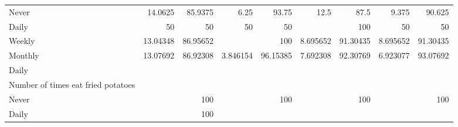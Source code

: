 \documentclass{article}
\begin{document}
\begin{tabular}{lllllllll}
\multicolumn{1}{l}{\hspace{7em}Never} &
  \multicolumn{1}{|r}{14.0625} &
  \multicolumn{1}{r}{85.9375} &
  \multicolumn{1}{r}{6.25} &
  \multicolumn{1}{r}{93.75} &
  \multicolumn{1}{r}{12.5} &
  \multicolumn{1}{r}{87.5} &
  \multicolumn{1}{r}{9.375} &
  \multicolumn{1}{r}{90.625} \\
\multicolumn{1}{l}{\hspace{7em}Daily} &
  \multicolumn{1}{|r}{50} &
  \multicolumn{1}{r}{50} &
  \multicolumn{1}{r}{50} &
  \multicolumn{1}{r}{50} &
  \multicolumn{1}{r}{} &
  \multicolumn{1}{r}{100} &
  \multicolumn{1}{r}{50} &
  \multicolumn{1}{r}{50} \\
\multicolumn{1}{l}{\hspace{7em}Weekly} &
  \multicolumn{1}{|r}{13.04348} &
  \multicolumn{1}{r}{86.95652} &
  \multicolumn{1}{r}{} &
  \multicolumn{1}{r}{100} &
  \multicolumn{1}{r}{8.695652} &
  \multicolumn{1}{r}{91.30435} &
  \multicolumn{1}{r}{8.695652} &
  \multicolumn{1}{r}{91.30435} \\
\multicolumn{1}{l}{\hspace{7em}Monthly} &
  \multicolumn{1}{|r}{13.07692} &
  \multicolumn{1}{r}{86.92308} &
  \multicolumn{1}{r}{3.846154} &
  \multicolumn{1}{r}{96.15385} &
  \multicolumn{1}{r}{7.692308} &
  \multicolumn{1}{r}{92.30769} &
  \multicolumn{1}{r}{6.923077} &
  \multicolumn{1}{r}{93.07692} \\
\multicolumn{1}{l}{\hspace{5em}Daily} &
  \multicolumn{1}{|r}{} &
  \multicolumn{1}{r}{} &
  \multicolumn{1}{r}{} &
  \multicolumn{1}{r}{} &
  \multicolumn{1}{r}{} &
  \multicolumn{1}{r}{} &
  \multicolumn{1}{r}{} &
  \multicolumn{1}{r}{} \\
\multicolumn{1}{l}{\hspace{6em}Number of times eat fried potatoes} &
  \multicolumn{1}{|r}{} &
  \multicolumn{1}{r}{} &
  \multicolumn{1}{r}{} &
  \multicolumn{1}{r}{} &
  \multicolumn{1}{r}{} &
  \multicolumn{1}{r}{} &
  \multicolumn{1}{r}{} &
  \multicolumn{1}{r}{} \\
\multicolumn{1}{l}{\hspace{7em}Never} &
  \multicolumn{1}{|r}{} &
  \multicolumn{1}{r}{100} &
  \multicolumn{1}{r}{} &
  \multicolumn{1}{r}{100} &
  \multicolumn{1}{r}{} &
  \multicolumn{1}{r}{100} &
  \multicolumn{1}{r}{} &
  \multicolumn{1}{r}{100} \\
\multicolumn{1}{l}{\hspace{7em}Daily} &
  \multicolumn{1}{|r}{} &
  \multicolumn{1}{r}{100} &

\end{tabular}
\end{document}
